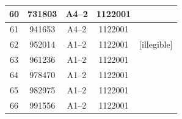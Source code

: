 \documentclass[UTF8,10pt,a4paper,fontset=fandol]{ctexart}
\newcommand{\fieldvalue}[1]{#1}
\newcommand{\handwritten}[1]{#1}
\begin{document}
\begin{center}
\begin{tabular}{|c|c|c|c|c|}
\fieldvalue{60} &
\fieldvalue{731803} &
\fieldvalue{A4--2} &
\fieldvalue{1122001} & \\ \hline

\fieldvalue{61} &
\fieldvalue{941653} &
\fieldvalue{A4--2} &
\fieldvalue{1122001} & \\ \hline

\fieldvalue{62} &
\fieldvalue{952014} &
\fieldvalue{A1--2} &
\fieldvalue{1122001} &
\handwritten{[illegible]} \\ \hline

\fieldvalue{63} &
\fieldvalue{961236} &
\fieldvalue{A1--2} &
\fieldvalue{1122001} & \\ \hline

\fieldvalue{64} &
\fieldvalue{978470} &
\fieldvalue{A1--2} &
\fieldvalue{1122001} & \\ \hline

\fieldvalue{65} &
\fieldvalue{982975} &
\fieldvalue{A1--2} &
\fieldvalue{1122001} & \\ \hline

\fieldvalue{66} &
\fieldvalue{991556} &
\fieldvalue{A1--2} &
\fieldvalue{1122001} & \\ \hline


\end{tabular}
\end{center}
\end{document}
